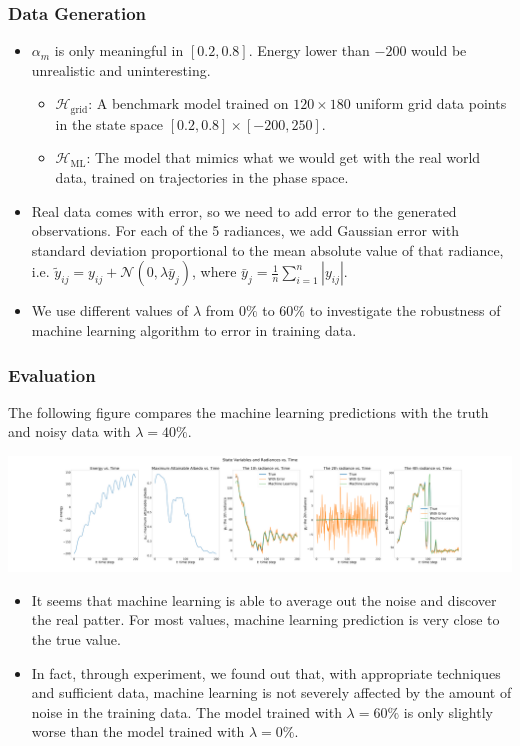 \documentclass{beamer}
\newcommand{\cN}{\mathcal{N}}
\newcommand{\cH}{\mathcal{H}}
\begin{document}
\begin{frame}
\frametitle{Data Generation}
\begin{itemize}
\item $\alpha_m$ is only meaningful in $[0.2,0.8]$. Energy lower than $-200$ would be unrealistic and uninteresting.
\begin{itemize}
	\item $\cH_{\text{grid}}$: A benchmark model trained on $120\times 180$ uniform grid data points in the state space $[0.2,0.8]\times [-200,250]$.
	\item $\cH_{\text{ML}}$: The model that mimics what we would get with the real world data, trained on trajectories in the phase space.
\end{itemize}
\item Real data comes with error, so we need to add error to the generated observations. For each of the 5 radiances, we add Gaussian error with standard deviation proportional to the mean absolute value of that radiance, i.e. $\tilde{y}_{ij} = y_{ij} + \cN(0,\lambda \bar{y}_j)$, where $\bar{y}_j =\frac{1}{n} \sum_{i=1}^n | y_{ij} |$.\par
\item We use different values of $\lambda$ from $0\%$ to $60\%$ to investigate the robustness of machine learning algorithm to error in training data.
\end{itemize}
\end{frame}

\begin{frame}
\frametitle{Evaluation}
The following figure compares the machine learning predictions with the truth and noisy data with $\lambda=40\%$.
\begin{center}
\includegraphics[width=\linewidth]{Figures/StateAndRadiances.png}
\end{center}
\begin{itemize}
\item It seems that machine learning is able to average out the noise and discover the real patter. For most values, machine learning prediction is very close to the true value.
\item In fact, through experiment, we found out that, with appropriate techniques and sufficient data, machine learning is not severely affected by the amount of noise in the training data. The model trained with $\lambda=60\%$ is only slightly worse than the model trained with $\lambda=0\%$.
\end{itemize}
\end{frame}
\end{document}
